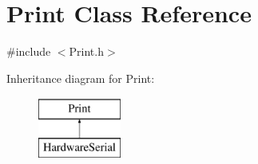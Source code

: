\hypertarget{class_print}{
\section{Print Class Reference}
\label{class_print}
}


{\ttfamily \#include $<$Print.h$>$}

Inheritance diagram for Print:\begin{figure}[H]
\begin{center}
\leavevmode
\includegraphics[height=2.000000cm]{class_print}
\end{center}
\end{figure}
